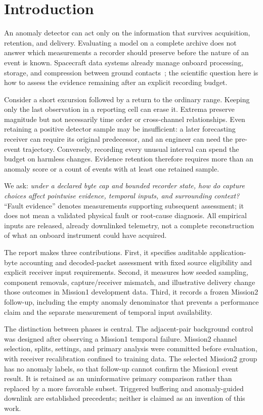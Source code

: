\section{Introduction}
An anomaly detector can act only on the information that survives acquisition,
retention, and delivery. Evaluating a model on a complete archive does not answer
which measurements a recorder should preserve before the nature of an event is
known. Spacecraft data systems already manage onboard processing, storage, and
compression between ground contacts~\citep{esa-data-systems}; the scientific question
here is how to assess the evidence remaining after an explicit recording budget.

Consider a short excursion followed by a return to the ordinary range. Keeping
only the last observation in a reporting cell can erase it. Extrema preserve
magnitude but not necessarily time order or cross-channel relationships. Even
retaining a positive detector sample may be insufficient: a later forecasting
receiver can require its original predecessor, and an engineer can need the
pre-event trajectory. Conversely, recording every unusual interval can spend the
budget on harmless changes. Evidence retention therefore requires more than an
anomaly score or a count of events with at least one retained sample.

We ask: \emph{under a declared byte cap and bounded recorder state, how do capture
choices affect pointwise evidence, temporal inputs, and surrounding context?}
``Fault evidence'' denotes measurements supporting subsequent assessment; it does
not mean a validated physical fault or root-cause diagnosis. All empirical inputs
are released, already downlinked telemetry, not a complete reconstruction of what
an onboard instrument could have acquired.

The report makes three contributions. First, it specifies auditable application-
byte accounting and decoded-packet assessment with fixed source eligibility and
explicit receiver input requirements. Second, it measures how seeded sampling,
component removals, capture/receiver mismatch, and illustrative delivery change
those outcomes in Mission1 development data. Third, it records a frozen Mission2
follow-up, including the empty anomaly denominator that prevents a performance
claim and the separate measurement of temporal input availability.

The distinction between phases is central. The adjacent-pair background control
was designed after observing a Mission1 temporal failure. Mission2 channel
selection, splits, settings, and primary analysis were committed before evaluation,
with receiver recalibration confined to training data. The selected Mission2 group
has no anomaly labels, so that follow-up cannot confirm the Mission1 event result.
It is retained as an uninformative primary comparison rather than replaced by a
more favorable subset. Triggered buffering and anomaly-guided downlink are
established precedents; neither is claimed as an invention of this work.
